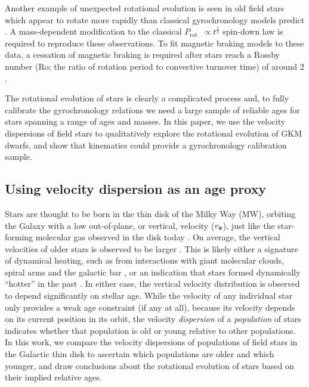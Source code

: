 \documentclass{aastex63}
\newcommand{\eg}{{\it e.g.}}
\newcommand{\prot}{$P_{\mathrm{rot}}$}
\newcommand{\vz}{$v_{\bf z}$}
\newcommand{\racomment}[1]{{\color{blue}#1}}
\begin{document}
Another example of unexpected rotational evolution is seen in old field stars
which appear to rotate more rapidly than classical gyrochronology models
predict \citep{angus2015, vansaders2016, vansaders2018, metcalfe2019}.
A mass-dependent modification to the classical \prot\ $\propto
t^{\frac{1}{2}}$ spin-down law \citep{skumanich1972} is required to reproduce
these observations.
To fit magnetic braking models to these data, a cessation of magnetic braking
is required after stars reach a Rossby number (Ro; the ratio of rotation
period to convective turnover time) of around 2 \citep{vansaders2016,
vansaders2018}.

The rotational evolution of stars is clearly a complicated process and, to
fully calibrate the gyrochronology relations we need a large sample of
reliable ages for stars spanning a range of ages and masses.
In this paper, we use the velocity dispersions of field stars to qualitatively
explore the rotational evolution of GKM dwarfs, and show that kinematics could
provide a gyrochronology calibration sample.

\subsection{Using velocity dispersion as an age proxy}

Stars are thought to be born in the thin disk of the Milky Way (MW), orbiting
the Galaxy with a low out-of-plane, or vertical, velocity (\vz),
just like the star-forming molecular gas observed in the disk today
\citep[\eg][]{stark1989, stark2005, aumer2009, martig2014, aumer2016}.
On average, the vertical velocities of older stars is observed to be larger
\citep[\eg][]{nordstrom2004, holmberg2007, holmberg2009, aumer2009,
casagrande2011}.
This is likely either a signature of dynamical heating, such as from
interactions with giant molecular clouds, spiral arms and the galactic bar
\citep[see][for a review of secular evolution in the MW]{sellwood2014}, or an
indication that stars formed dynamically ``hotter'' in the past
\citep[e.g.,][]{bird2013}.
In either case, the vertical velocity distribution is observed to depend
significantly on stellar age.
While the velocity of any individual star only provides a weak age constraint
\racomment{(if any at all)}, because its velocity depends on its current
position in its orbit, the velocity {\it dispersion} of a {\it population} of
stars indicates whether that population is old or young relative to other
populations.
In this work, we compare the velocity dispersions of populations of field
stars in the Galactic thin disk to ascertain which populations are older and
which younger, and draw conclusions about the rotational evolution of stars
based on their implied relative ages.
\end{document}
